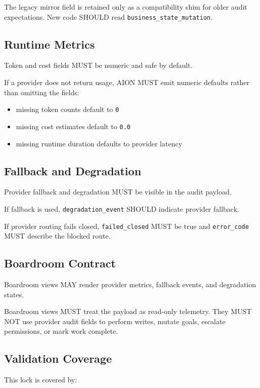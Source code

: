The legacy mirror field is retained only as a compatibility shim for older audit expectations. New code SHOULD read \texttt{business\_state\_mutation}.

\subsection{Runtime Metrics}

Token and cost fields MUST be numeric and safe by default.

If a provider does not return usage, AION MUST emit numeric defaults rather than omitting the fields:

\begin{itemize}
  \item missing token counts default to \texttt{0}
  \item missing cost estimates default to \texttt{0.0}
  \item missing runtime duration defaults to provider latency
\end{itemize}

\subsection{Fallback and Degradation}

Provider fallback and degradation MUST be visible in the audit payload.

If fallback is used, \texttt{degradation\_event} SHOULD indicate provider fallback.

If provider routing fails closed, \texttt{failed\_closed} MUST be true and \texttt{error\_code} MUST describe the blocked route.

\subsection{Boardroom Contract}

Boardroom views MAY render provider metrics, fallback events, and degradation states.

Boardroom views MUST treat the payload as read-only telemetry. They MUST NOT use provider audit fields to perform writes, mutate goals, escalate permissions, or mark work complete.

\subsection{Validation Coverage}

This lock is covered by:

